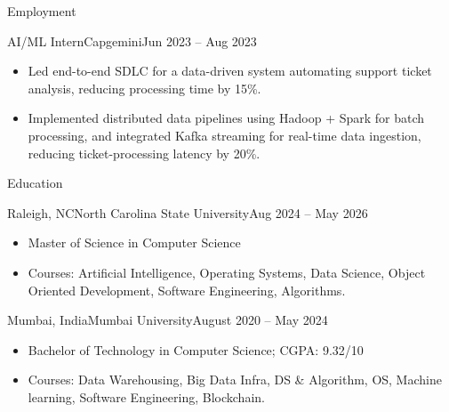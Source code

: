 \documentclass[]{mcdowellcv}
\begin{document}
\begin{cvsection}{Employment}
  \begin{cvsubsection}{AI/ML Intern}{Capgemini}{Jun 2023 -- Aug 2023}
    \begin{itemize}
      \item Led end-to-end SDLC for a data-driven system automating support ticket analysis, reducing processing time by 15\%.
      \item Implemented distributed data pipelines using Hadoop + Spark for batch processing, and integrated Kafka streaming for real-time data ingestion, reducing ticket-processing latency by 20\%.
    \end{itemize}
    \vspace{-1.5pt}
  \end{cvsubsection}

\end{cvsection}

\begin{cvsection}{Education}
  \begin{cvsubsection}{Raleigh, NC}{North Carolina State University}{Aug 2024 -- May 2026}
    \begin{itemize}
      \item Master of Science in Computer Science
      \item Courses: Artificial Intelligence, Operating Systems, Data Science, Object Oriented Development, Software Engineering, Algorithms.
    \end{itemize}
    \vspace{-1.5pt}
  \end{cvsubsection}

  \begin{cvsubsection}{Mumbai, India}{Mumbai University}{August 2020 -- May 2024}
    \begin{itemize}
      \item Bachelor of Technology in Computer Science; CGPA: 9.32/10
      \item Courses: Data Warehousing, Big Data Infra, DS \& Algorithm, OS, Machine learning, Software Engineering, Blockchain.
    \end{itemize}
  \end{cvsubsection}
\end{cvsection}
\end{document}
